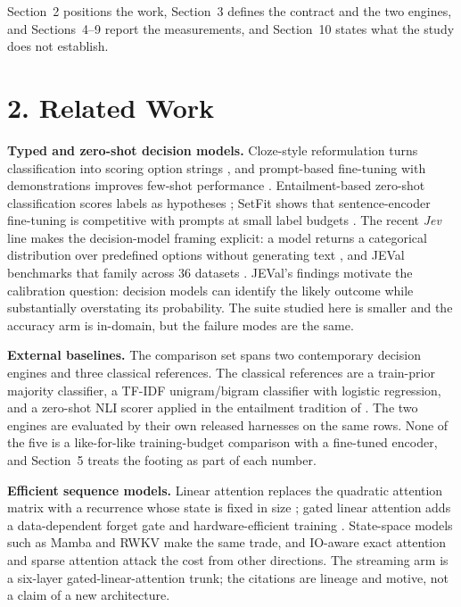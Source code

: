 \documentclass[11pt]{article}
\begin{document}
Section~2 positions the work, Section~3 defines the contract and
the two engines, and Sections~4--9 report the
measurements, and Section~10 states what the study does not establish.

\section*{2. Related Work}
\textbf{Typed and zero-shot decision models.}
Cloze-style reformulation turns classification into scoring option strings
\citep{schick2021pet}, and prompt-based fine-tuning with demonstrations improves few-shot
performance \citep{gao2021lmbff}. Entailment-based zero-shot classification scores labels as
hypotheses \citep{yin2019benchmarking}; SetFit shows that sentence-encoder fine-tuning is
competitive with prompts at small label budgets \citep{tunstall2022setfit}. The recent \emph{Jev}
line makes the decision-model framing explicit: a model returns a categorical distribution over
predefined options without generating text \citep{li2026jev}, and JEVal benchmarks that family
across 36 datasets \citep{duan2026gdm}. JEVal's findings motivate the calibration question:
decision models can identify the likely outcome while substantially overstating its probability.
The suite studied here is smaller and the accuracy arm is in-domain, but the failure modes are
the same.

\textbf{External baselines.}
The comparison set spans two contemporary decision engines and three classical references. The
classical references are a train-prior majority classifier, a TF-IDF unigram/bigram classifier
with logistic regression, and a zero-shot NLI scorer applied in the entailment tradition of
\citet{yin2019benchmarking}. The two engines are evaluated by their own released harnesses on the
same rows. None of the five is a like-for-like training-budget comparison with a fine-tuned
encoder, and Section~5 treats the footing as part of each number.

\textbf{Efficient sequence models.}
Linear attention replaces the quadratic attention matrix with a recurrence whose state is fixed
in size \citep{katharopoulos2020transformers}; gated linear attention adds a data-dependent forget
gate and hardware-efficient training \citep{yang2024gla}. State-space models such as Mamba
\citep{gu2024mamba} and RWKV \citep{peng2023rwkv} make the same trade, and IO-aware exact attention
\citep{dao2022flashattention} and sparse attention \citep{beltagy2020longformer} attack the cost
from other directions. The streaming arm is a six-layer gated-linear-attention trunk; the
citations are lineage and motive, not a claim of a new architecture.
\end{document}
